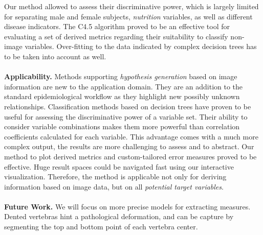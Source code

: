\documentclass[a4paper,twoside]{style/article}
\begin{document}
Our method allowed to assess their discriminative power, which is largely limited for separating male and female subjects, \emph{nutrition} variables, as well as different disease indicators.
The C4.5 algorithm proved to be an effective tool for evaluating a set of derived metrics regarding their suitability to classify non-image variables.
Over-fitting to the data indicated by complex decision trees has to be taken into account as well.
\\\\
\noindent \textbf{Applicability.}
Methods supporting \emph{hypothesis generation} based on image information are new to the application domain.
They are an addition to the standard epidemiological workflow as they highlight new possibly unknown relationships.
Classification methods based on decision trees have proven to be useful for assessing the discriminative power of a variable set.
Their ability to consider variable combinations makes them more powerful than correlation coefficients calculated for each variable.
This advantage comes with a much more complex output, the results are more challenging to assess and to abstract.
Our method to plot derived metrics and custom-tailored error measures proved to be effective.
Huge result spaces could be navigated fast using our interactive visualization.
Therefore, the method is applicable not only for deriving information based on image data, but on all \emph{potential target variables}.
\\\\
\noindent \textbf{Future Work.}
We will focus on more precise models for extracting measures.
Dented vertebras hint a pathological deformation, and can be capture by segmenting the top and bottom point of each vertebra center.
\end{document}
